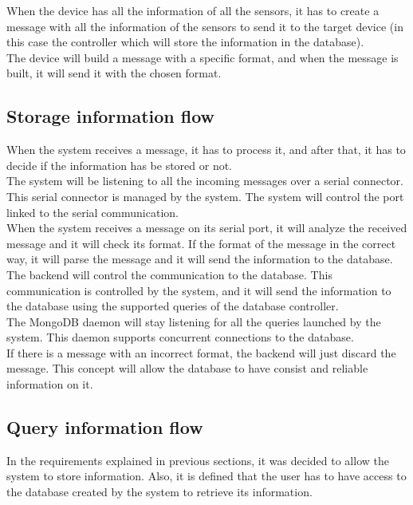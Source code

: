 When the device has all the information of all the sensors, it has to create a message with all the information of the sensors to send it to the target device (in this case the controller which will store the information in the database).\\

The device will build a message with a specific format, and when the message is built, it will send it with the chosen format.

\subsection{Storage information flow}

When the system receives a message, it has to process it, and after that, it has to decide if the information has be stored or not.\\

The system will be listening to all the incoming messages over a serial connector. This serial connector is managed by the system. The system will control the port linked to the serial communication.\\

When the system receives a message on its serial port, it will analyze the received message and it will check its format. If the format of the message in the correct way, it will parse the message and it will send the information to the database.\\

The backend will control the communication to the database. This communication is controlled by the system, and it will send the information to the database using the supported queries of the database controller.\\

The MongoDB daemon will stay listening for all the queries launched by the system. This daemon supports concurrent connections to the database.\\

If there is a message with an incorrect format, the backend will just discard the message. This concept will allow the database to have consist and reliable information on it.

\subsection{Query information flow}

In the requirements explained in previous sections, it was decided to allow the system to store information. Also, it is defined that the user has to have access to the database created by the system to retrieve its information.\\

